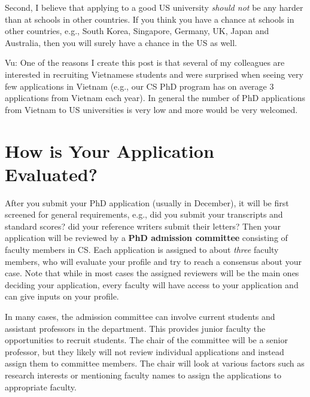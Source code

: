 \documentclass[11pt]{article}
\newenvironment{commentbox}{
 \small
    \begin{cbox}
 }{
   \end{cbox}
}
\begin{document}
Second, I believe that applying to a good US university \emph{should not} be any
harder than at schools in other countries. If you think you have a
chance at schools in other countries, e.g., South Korea, Singapore, Germany, UK, Japan and Australia, then you will surely have a chance in the US as well.

\begin{commentbox}
Vu: One of the reasons I create this post is that several of my colleagues are interested in 
recruiting Vietnamese students and were surprised when seeing very few applications in Vietnam (e.g., our CS PhD program has on average 3 applications from Vietnam each year). In general the number of
PhD applications from Vietnam to US universities is very low and  more would be very welcomed. 
\end{commentbox}



\section{How is Your Application Evaluated?}

After you submit your PhD application (usually in December), it will be first screened
for general requirements, e.g., did you submit your transcripts and standard scores? did your reference writers submit their letters?
Then your application will be reviewed by a
\textbf{PhD admission committee} consisting of faculty members in CS. Each application is assigned to about \emph{three} faculty members, who will evaluate your profile and try to reach a consensus about your case.  Note that while in most cases the assigned reviewers will be the main ones deciding your application, every faculty will have access to your application and can give inputs on your profile.

In many cases, the admission committee can involve current students and assistant professors in the department. This provides junior faculty the opportunities to recruit students. The chair of the committee will be a senior professor, but they likely will not review individual applications and instead assign them to committee members. The chair will look at various factors such as research interests or mentioning faculty names to assign the applications to appropriate faculty. 
\end{document}
